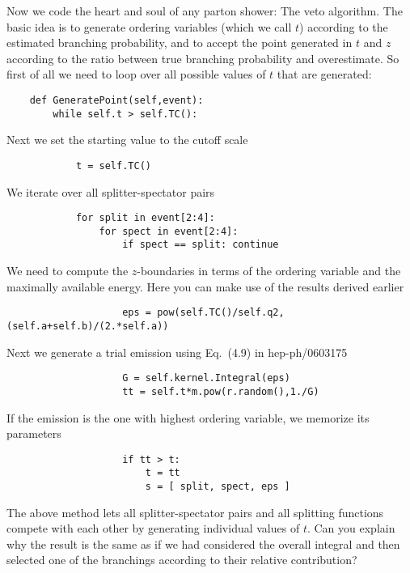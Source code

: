 \documentclass[10pt,fleqn]{scrartcl}
\begin{document}
Now we code the heart and soul of any parton shower: The veto algorithm.
The basic idea is to generate ordering variables (which we call $t$)
according to the estimated branching probability, and to accept the point
generated in $t$ and $z$ according to the ratio between true 
branching probability and overestimate. So first of all we need to loop 
over all possible values of $t$ that are generated:
\begin{verbatim}
    def GeneratePoint(self,event):
        while self.t > self.TC():
\end{verbatim}
Next we set the starting value to the cutoff scale
\begin{verbatim}
            t = self.TC()
\end{verbatim}
We iterate over all splitter-spectator pairs
\begin{verbatim}
            for split in event[2:4]:
                for spect in event[2:4]:
                    if spect == split: continue
\end{verbatim}
We need to compute the $z$-boundaries in terms of the ordering variable
and the maximally available energy. Here you can make use of the results
derived earlier
\begin{verbatim}
                    eps = pow(self.TC()/self.q2,(self.a+self.b)/(2.*self.a))
\end{verbatim}
Next we generate a trial emission using Eq.~(4.9) in hep-ph/0603175
\begin{verbatim}
                    G = self.kernel.Integral(eps)
                    tt = self.t*m.pow(r.random(),1./G)
\end{verbatim}
If the emission is the one with highest ordering variable, we memorize 
its parameters
\begin{verbatim}
                    if tt > t:
                        t = tt
                        s = [ split, spect, eps ]
\end{verbatim}
The above method lets all splitter-spectator pairs and all splitting functions
compete with each other by generating individual values of $t$. Can you explain 
why the result is the same as if we had considered the overall integral and then
selected one of the branchings according to their relative contribution?
 
\end{document}
